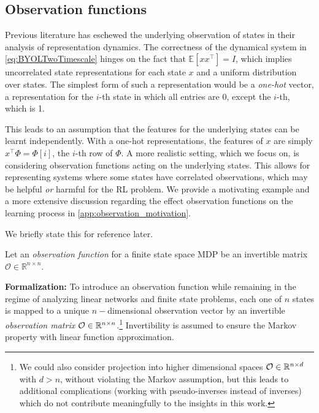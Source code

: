 \subsection{Observation functions}
Previous literature \parencite{tang2022understanding,tang2023towards,lelan2022generalization} has eschewed the underlying observation of states in their analysis of representation dynamics. 
The correctness of the dynamical system in \autoref{eq:BYOLTwoTimescale} hinges on the fact that $\mathbb{E}[xx^\top ] = I$, which implies uncorrelated state representations for each state $x$ and a uniform distribution over states.
The simplest form of such a representation would be a \emph{one-hot} vector, a representation for the $i$-th state in which all entries are 0, except the $i$-th, which is 1.

This leads to an assumption that the features for the underlying states can be learnt independently.
With a one-hot representations, the features of $x$ are simply $x^\top \Phi = \Phi[i]$, the $i$-th row of $\Phi$.
A more realistic setting, which we focus on, is considering observation functions acting on the underlying states. 
This allows for representing systems where some states have correlated observations, which may be helpful \emph{or} harmful for the RL problem. 
We provide a motivating example and a more extensive discussion regarding the effect observation functions on the learning process in \autoref{app:observation_motivation}.

We briefly state this for reference later.
\begin{assumption}
    \label{assumption2}
    Let an \emph{observation function} for a finite state space MDP be an invertible matrix $\mathcal{O} \in \mathbb{R}^{n \times n}$.
\end{assumption}

\textbf{Formalization:} To introduce an observation function while remaining in the regime of analyzing linear networks and finite state problems, each one of $n$ states is mapped to a unique $n-$dimensional observation vector by an invertible \emph{observation matrix} ${\mathcal{O}} \in \mathbb{R}^{n \times n}$.\footnote{We could also consider projection into higher dimensional spaces ${\mathcal{O}} \in \mathbb{R}^{n \times d}$ with $d > n$, without violating the Markov assumption, but this leads to additional complications (working with pseudo-inverses instead of inverses) which do not contribute meaningfully to the insights in this work.}
Invertibility is assumed to ensure the Markov property with linear function approximation.

